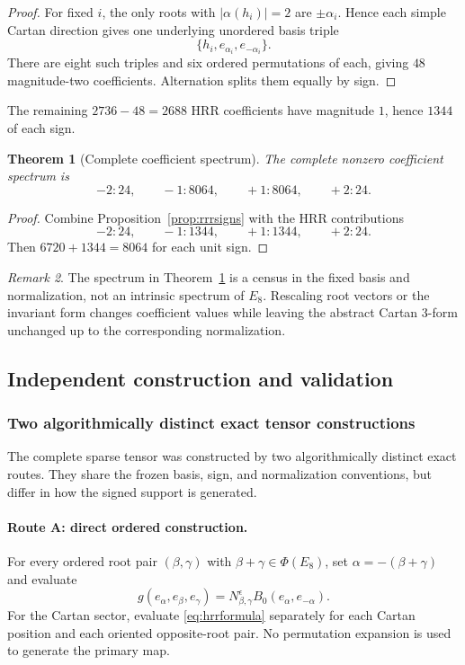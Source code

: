 \documentclass[11pt]{article}
\newtheorem{theorem}{Theorem}[section]
\theoremstyle{definition}
\theoremstyle{remark}
\newtheorem{remark}[theorem]{Remark}
\newcommand{\PhiE}{\Phi(E_8)}
\newcommand{\HRR}{\mathrm{HRR}}
\begin{document}
\begin{proof}
For fixed $i$, the only roots with $|\alpha(h_i)|=2$ are $\pm\alpha_i$.  Hence each simple Cartan direction gives one underlying unordered basis triple
\[
\{h_i,e_{\alpha_i},e_{-\alpha_i}\}.
\]
There are eight such triples and six ordered permutations of each, giving $48$ magnitude-two coefficients.  Alternation splits them equally by sign.
\end{proof}

The remaining $2736-48=2688$ $\HRR$ coefficients have magnitude $1$, hence $1344$ of each sign.

\begin{theorem}[Complete coefficient spectrum]\label{thm:spectrum}
The complete nonzero coefficient spectrum is
\[
\boxed{
-2:24,\qquad
-1:8064,\qquad
+1:8064,\qquad
+2:24.}
\]
\end{theorem}

\begin{proof}
Combine Proposition~\ref{prop:rrrsigns} with the $\HRR$ contributions
\[
-2:24,\qquad -1:1344,\qquad +1:1344,\qquad +2:24.
\]
Then $6720+1344=8064$ for each unit sign.
\end{proof}

\begin{remark}
The spectrum in Theorem~\ref{thm:spectrum} is a census in the fixed basis and normalization, not an intrinsic spectrum of $E_8$.  Rescaling root vectors or the invariant form changes coefficient values while leaving the abstract Cartan 3-form unchanged up to the corresponding normalization.
\end{remark}

\subsection{Independent construction and validation}\label{sec:validation}

\subsubsection{Two algorithmically distinct exact tensor constructions}

The complete sparse tensor was constructed by two algorithmically distinct exact routes.  They share the frozen basis, sign, and normalization conventions, but differ in how the signed support is generated.

\paragraph{Route A: direct ordered construction.}
For every ordered root pair $(\beta,\gamma)$ with $\beta+\gamma\in\PhiE$, set $\alpha=-(\beta+\gamma)$ and evaluate
\[
g(e_\alpha,e_\beta,e_\gamma)
=N_{\beta,\gamma}^{\epsilon}B_0(e_\alpha,e_{-\alpha}).
\]
For the Cartan sector, evaluate \eqref{eq:hrrformula} separately for each Cartan position and each oriented opposite-root pair.  No permutation expansion is used to generate the primary map.
\end{document}
